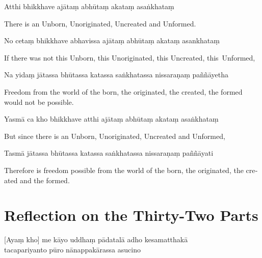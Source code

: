 \begin{leader}
\end{leader}


Atthi bhikkhave ajātaṃ abhūtaṃ akataṃ asaṅkhataṃ

\begin{english}
  There is an Unborn, Unoriginated, Uncreated and Unformed.
\end{english}

No cetaṃ bhikkhave abhavissa ajātaṃ abhūtaṃ akataṃ asankhataṃ

\begin{english}
  If there was not this Unborn, this Unoriginated, this Uncreated, this~Unformed,
\end{english}

Na yidaṃ jātassa bhūtassa katassa saṅkhatassa nissaraṇaṃ paññāyetha

\begin{english}
  Freedom from the world of the born, the originated, the created, the formed would not be possible.
\end{english}

Yasmā ca kho bhikkhave atthi ajātaṃ abhūtaṃ akataṃ asaṅkhataṃ

\begin{english}
  But since there is an Unborn, Unoriginated, Uncreated and Unformed,
\end{english}

Tasmā jātassa bhūtassa katassa saṅkhatassa nissaraṇaṃ paññāyati

\begin{english}
  Therefore is freedom possible from the world of the born, the originated, the created and the formed.
\end{english}


\section{Reflection on the Thirty-Two Parts}

\begin{leader}
\end{leader}


[Ayaṃ kho] me kāyo uddhaṃ pādatalā adho kesamatthakā\\
tacapariyanto pūro nānappakārassa asucino

